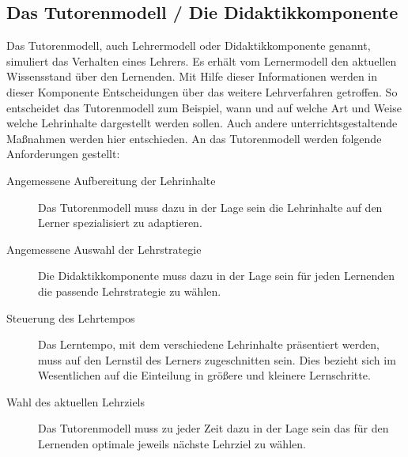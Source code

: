 \subsection{Das Tutorenmodell / Die Didaktikkomponente}
Das Tutorenmodell, auch Lehrermodell oder Didaktikkomponente genannt, simuliert das Verhalten eines Lehrers.
Es erhält vom Lernermodell den aktuellen Wissensstand über den Lernenden. Mit Hilfe dieser Informationen
werden in dieser Komponente Entscheidungen über das weitere Lehrverfahren getroffen.
So entscheidet das Tutorenmodell zum Beispiel, wann und auf welche Art und Weise welche Lehrinhalte
dargestellt werden sollen. Auch andere unterrichtsgestaltende Maßnahmen werden hier entschieden.
An das Tutorenmodell werden folgende Anforderungen gestellt:
\begin{description}
	\item[Angemessene Aufbereitung der Lehrinhalte]
  Das Tutorenmodell muss dazu in der Lage sein die Lehrinhalte
	auf den Lerner spezialisiert zu adaptieren.

	\item[Angemessene Auswahl der Lehrstrategie]
  Die Didaktikkomponente muss dazu in der Lage sein für jeden Lernenden die passende Lehrstrategie zu wählen.

	\item[Steuerung des Lehrtempos]
  Das Lerntempo, mit dem verschiedene Lehrinhalte präsentiert werden, muss auf den Lernstil des Lerners zugeschnitten sein.
	Dies bezieht sich im Wesentlichen auf die Einteilung in größere und kleinere Lernschritte.

	\item[Wahl des aktuellen Lehrziels]
	Das Tutorenmodell muss zu jeder Zeit dazu in der Lage sein das für den Lernenden optimale jeweils nächste Lehrziel zu wählen.
\end{description}

